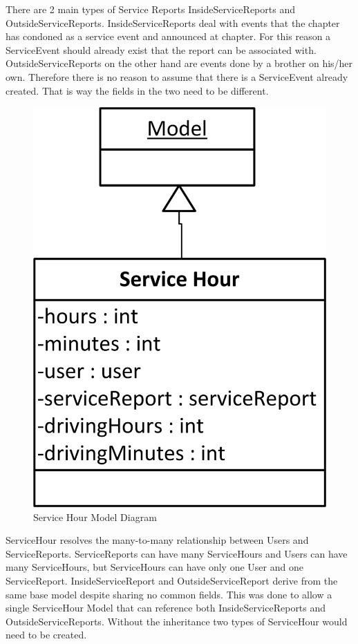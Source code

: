 \documentclass{article}
\begin{document}
There are 2 main types of Service Reports InsideServiceReports and OutsideServiceReports. InsideServiceReports deal with events that the chapter has condoned as a service event and announced at chapter. For this reason a ServiceEvent should already exist that the report can be associated with. OutsideServiceReports on the other hand are events done by a brother on his/her own. Therefore there is no reason to assume that there is a ServiceEvent already created. That is way the fields in the two need to be different.

\FloatBarrier
\begin{figure}[h!]
\centering
\includegraphics[scale=.65]{img/modelDiagrams/serviceHourModel}
\caption{Service Hour Model Diagram}
\label{fig:serviceHourModelDiagram}
\end{figure}
\FloatBarrier

ServiceHour resolves the many-to-many relationship between Users and ServiceReports. ServiceReports can have many ServiceHours and Users can have many ServiceHours, but ServiceHours can have only one User and one ServiceReport. InsideServiceReport and OutsideServiceReport derive from the same base model despite sharing no common fields. This was done to allow a single ServiceHour Model that can reference both InsideServiceReports and OutsideServiceReports. Without the inheritance two types of ServiceHour would need to be created.
\end{document}
